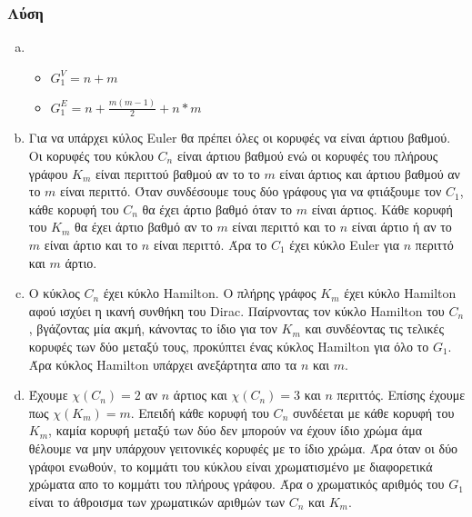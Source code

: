 \documentclass{assignment}
\begin{document}
\subsubsection*{Λύση}

\begin{enumerate}[(a)]
\item
\begin{itemize}[label={}]
  \item $\displaystyle G_1^V = n + m$ 
  \item $\displaystyle G_1^E = n + \frac{m(m-1)}{2} + n*m$
\end{itemize}

\item
Για να υπάρχει κύλος \textlatin{Euler} θα πρέπει όλες οι κορυφές να είναι άρτιου βαθμού. 
Οι κορυφές του κύκλου $C_n$ είναι άρτιου βαθμού ενώ οι κορυφές του πλήρους γράφου $K_m$ είναι περιττού 
βαθμού αν το το $m$ είναι άρτιος και άρτιου βαθμού αν το $m$ είναι περιττό. Όταν συνδέσουμε τους δύο γράφους
για να φτιάξουμε τον $C_1$, κάθε κορυφή του $C_n$ θα έχει άρτιο βαθμό όταν το $m$ είναι άρτιος.
Κάθε κορυφή του $K_m$ θα έχει άρτιο βαθμό αν το $m$ είναι περιττό και το $n$ είναι άρτιο ή αν το $m$ 
είναι άρτιο και το $n$ είναι περιττό. Άρα το $C_1$ έχει κύκλο \textlatin{Euler} για $n$ περιττό και $m$ άρτιο.

\item
Ο κύκλος $C_n$ έχει κύκλο \textlatin{Hamilton}. Ο πλήρης γράφος $K_m$ έχει κύκλο \textlatin{Hamilton} αφού 
ισχύει η ικανή συνθήκη του \textlatin{Dirac}. Παίρνοντας τον κύκλο \textlatin{Hamilton} του $C_n$, βγάζοντας
μία ακμή, κάνοντας το ίδιο για τον $K_m$ και συνδέοντας τις τελικές κορυφές των δύο μεταξύ τους, προκύπτει ένας
κύκλος \textlatin{Hamilton} για όλο το $G_1$. Άρα κύκλος \textlatin{Hamilton} υπάρχει ανεξάρτητα απο τα $n$ και $m$.

\item
Έχουμε $\chi(C_n) = 2$ αν $n$ άρτιος και $\chi(C_n) = 3$ και $n$ περιττός. Επίσης έχουμε πως $\chi(K_m) = m$. Επειδή
κάθε κορυφή του $C_n$ συνδέεται με κάθε κορυφή του $K_m$, καμία κορυφή μεταξύ των δύο δεν μπορούν να έχουν ίδιο χρώμα
άμα θέλουμε να μην υπάρχουν γειτονικές κορυφές με το ίδιο χρώμα. Άρα όταν οι δύο γράφοι ενωθούν, το κομμάτι του κύκλου 
είναι χρωματισμένο με διαφορετικά χρώματα απο το κομμάτι του πλήρους γράφου. Άρα ο χρωματικός αριθμός του $G_1$ είναι
το άθροισμα των χρωματικών αριθμών των $C_n$ και $K_m$.

\end{enumerate}
\end{document}
